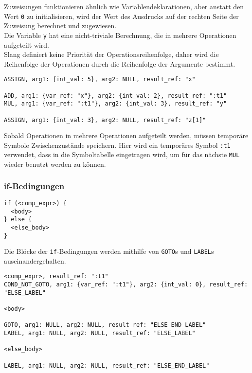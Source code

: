 Zuweisungen funktionieren ähnlich wie Variablendeklarationen, aber anstatt den Wert \texttt{0} zu initialisieren, wird der Wert des Ausdrucks auf der rechten Seite der Zuweisung berechnet und zugewiesen.\\
Die Variable \texttt{y} hat eine nicht-triviale Berechnung, die in mehrere Operationen aufgeteilt wird.\\
Slang definiert keine Priorität der Operationsreihenfolge, daher wird die Reihenfolge der Operationen durch die Reihenfolge der Argumente bestimmt.\\

\begin{lstlisting}[caption={Drei-Adressen Code für Zuweisungen}]
ASSIGN, arg1: {int_val: 5}, arg2: NULL, result_ref: "x"

ADD, arg1: {var_ref: "x"}, arg2: {int_val: 2}, result_ref: ":t1"
MUL, arg1: {var_ref: ":t1"}, arg2: {int_val: 3}, result_ref: "y"

ASSIGN, arg1: {int_val: 3}, arg2: NULL, result_ref: "z[1]"
\end{lstlisting}

Sobald Operationen in mehrere Operationen aufgeteilt werden, müssen temporäre Symbole Zwischenzustände speichern.
Hier wird ein temporäres Symbol \texttt{:t1} verwendet, dass in die Symboltabelle eingetragen wird, um für das nächste \texttt{MUL} wieder benutzt werden zu können.

\subsubsection{if-Bedingungen}

\begin{lstlisting}[caption={Slang Vorlage if-Bedingung}]
if (<comp_expr>) {
  <body>
} else {
  <else_body>
}
\end{lstlisting}

Die Blöcke der \texttt{if}-Bedingungen werden mithilfe von \texttt{GOTO}s und \texttt{LABEL}s auseinandergehalten.

\begin{lstlisting}[caption={Drei-Adressen Code Vorlage für if-Bedingung}]
<comp_expr>, result_ref: ":t1"
COND_NOT_GOTO, arg1: {var_ref: ":t1"}, arg2: {int_val: 0}, result_ref: "ELSE_LABEL"

<body>

GOTO, arg1: NULL, arg2: NULL, result_ref: "ELSE_END_LABEL"
LABEL, arg1: NULL, arg2: NULL, result_ref: "ELSE_LABEL"

<else_body>

LABEL, arg1: NULL, arg2: NULL, result_ref: "ELSE_END_LABEL"

\end{lstlisting}

